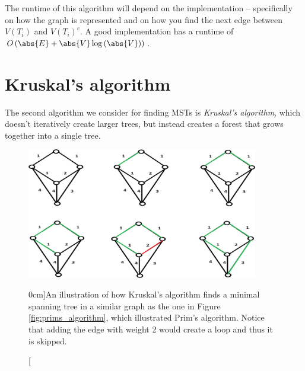\documentclass[nobib]{tufte-handout}
\begin{document}
\begin{remark}
  The runtime of this algorithm will depend on the implementation -- specifically on how the graph is represented and on how you find the next edge between $V(T_i)$ and $V(T_i)^c$. A good implementation has a runtime of $O\left(\abs{E} + \abs{V}\log\left(\abs{V}\right)\right)$.
\end{remark}

\section{Kruskal's algorithm}

The second algorithm we consider for finding MSTs is \emph{Kruskal's algorithm}, which doesn't iteratively create larger trees, but instead creates a forest that grows together into a single tree.

\begin{figure}
  \centering
  \includegraphics[width=0.9\textwidth]{graphics/L6_prim_kruskal_dijkstra/kruskal.png}
  \caption[][0cm]{An illustration of how Kruskal's algorithm finds a minimal spanning tree in a similar graph as the one in Figure \ref{fig:prims_algorithm}, which illustrated Prim's algorithm. Notice that adding the edge with weight 2 would create a loop and thus it is skipped.}
  \label{fig:kruskals_algorithm}
\end{figure}
\end{document}
